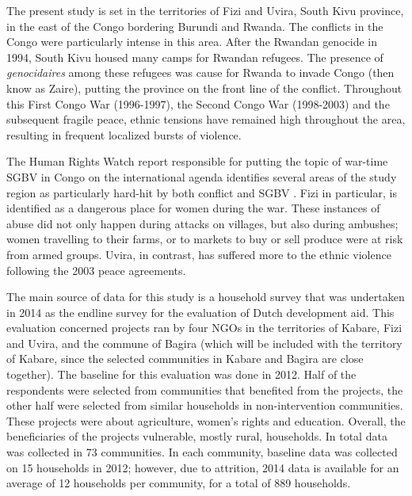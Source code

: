 \documentclass[10pt,a4paper,abstract=on]{scrartcl} %
\newcommand{\tableloc}{C:/Users/Koen/Dropbox/PhD/Papers/CongoGBV/Tables}
\begin{document}
\newcommand{\summstat}[2]{\csvreader[filter strcmp={\var}{#1}]{\tableloc/balance.csv}{var=\var,#2=\stat}{\stat}}

The present study is set in the territories of Fizi and Uvira, South Kivu province, in the east of the Congo bordering Burundi and Rwanda. The conflicts in the Congo were particularly intense in this area. After the Rwandan genocide in 1994, South Kivu housed many camps for Rwandan refugees. The presence of \textit{genocidaires} among these refugees was cause for Rwanda to invade Congo (then know as Zaire), putting the province on the front line of the conflict. Throughout this First Congo War (1996-1997), the Second Congo War (1998-2003) and the subsequent fragile peace, ethnic tensions have remained high throughout the area, resulting in frequent localized bursts of violence.

The Human Rights Watch report responsible for putting the topic of war-time SGBV in Congo on the international agenda identifies several areas of the study region as particularly hard-hit by both conflict and SGBV \citep{HRW2002}. Fizi in particular, is identified as a dangerous place for women during the war. These instances of abuse did not only happen during attacks on villages, but also during ambushes; women travelling to their farms, or to markets to buy or sell produce were at risk from armed groups. Uvira, in contrast, has suffered more to the ethnic violence following the 2003 peace agreements.

The main source of data for this study is a household survey that was undertaken in 2014 as the endline survey for the evaluation of Dutch development aid. This evaluation concerned projects ran by four NGOs in the territories of Kabare, Fizi and Uvira, and the commune of Bagira (which will be included with the territory of Kabare, since the selected communities in Kabare and Bagira are close together). The baseline for this evaluation was done in 2012. Half of the respondents were selected from communities that benefited from the projects, the other half were selected from similar households in non-intervention communities. These projects were about agriculture, women's rights and education. Overall, the beneficiaries of the projects vulnerable, mostly rural, households. In total data was collected in 73 communities. In each community, baseline data was collected on 15 households in 2012; however, due to attrition, 2014 data is available for an average of 12 households per community, for a total of 889 households. 
\end{document}
